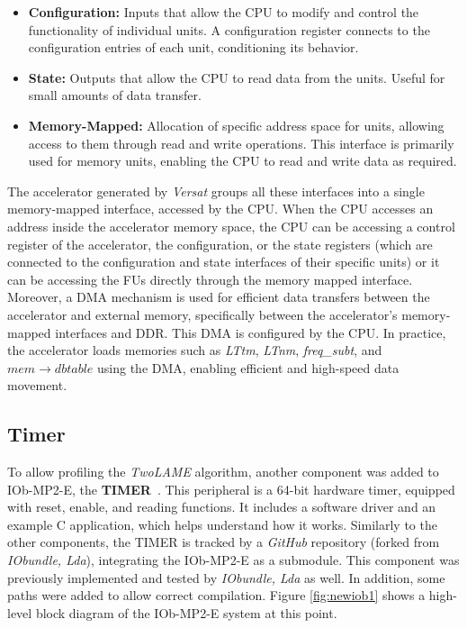 \begin{itemize}
    \item \textbf{Configuration:} Inputs that allow the CPU to modify and control the functionality of individual units. A configuration register connects to the configuration entries of each unit, conditioning its behavior. 
    \item \textbf{State:} Outputs that allow the CPU to read data from the units. Useful for small amounts of data transfer.
    \item \textbf{Memory-Mapped:} Allocation of specific address space for units, allowing access to them through read and write operations. This interface is primarily used for memory units, enabling the CPU to read and write data as required.
\end{itemize}

The accelerator generated by \textit{Versat} groups all these interfaces into a single memory-mapped interface, accessed by the CPU. When the CPU accesses an address inside the accelerator memory space, the CPU can be accessing a control register of the accelerator, the configuration, or the state registers (which are connected to the configuration and state interfaces of their specific units) or it can be accessing the FUs directly through the memory mapped interface.
Moreover, a DMA mechanism is used for efficient data transfers between the accelerator and external memory, specifically between the accelerator's memory-mapped interfaces and DDR. This DMA is configured by the CPU. In practice, the accelerator loads memories such as \textit{LTtm}, \textit{LTnm}, \textit{freq\_subt}, and $mem\to dbtable$ using the DMA, enabling efficient and high-speed data movement.

\subsection{Timer}
To allow profiling the \textit{TwoLAME} algorithm, another component was added to IOb-MP2-E, the \textbf{TIMER}~\cite{bib:iobtimer}. This peripheral is a 64-bit hardware timer, equipped with reset, enable, and reading functions. It includes a software driver and an example C application, which helps understand how it works. 
Similarly to the other components, the TIMER is tracked by a \textit{GitHub} repository (forked from \textit{IObundle, Lda}), integrating the IOb-MP2-E as a submodule. This component was previously implemented and tested by \textit{IObundle, Lda} as well. In addition, some paths were added to allow correct compilation. 
Figure \ref{fig:newiob1} shows a high-level block diagram of the IOb-MP2-E system at this point.

